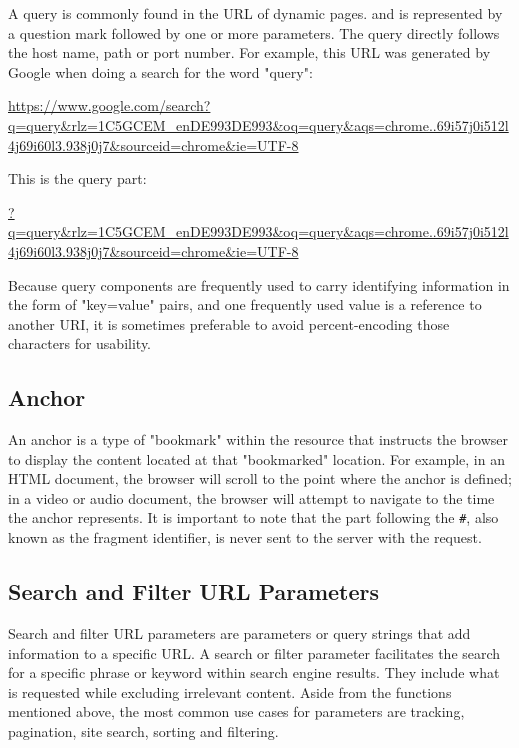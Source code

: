 A query is commonly found in the URL of dynamic pages. and is represented by a question mark followed by one or more parameters. The query directly follows the host name, path or port number. For example, this URL was generated by Google when doing a search for the word "query":

\begin{center}
  \url{https://www.google.com/search?q=query&rlz=1C5GCEM_enDE993DE993&oq=query&aqs=chrome..69i57j0i512l4j69i60l3.938j0j7&sourceid=chrome&ie=UTF-8}
\end{center}

\noindent This is the query part:

\begin{center}
  \url{?q=query&rlz=1C5GCEM_enDE993DE993&oq=query&aqs=chrome..69i57j0i512l4j69i60l3.938j0j7&sourceid=chrome&ie=UTF-8}
\end{center}

Because query components are frequently used to carry identifying information in the form of "key=value" pairs, and one frequently used value is a reference to another URI, it is sometimes preferable to avoid percent-encoding those characters for usability.

\subsection*{Anchor}
An anchor is a type of "bookmark" within the resource that instructs the browser to display the content located at that "bookmarked" location. For example, in an HTML document, the browser will scroll to the point where the anchor is defined; in a video or audio document, the browser will attempt to navigate to the time the anchor represents. It is important to note that the part following the \texttt{\#}, also known as the fragment identifier, is never sent to the server with the request.

\subsection{Search and Filter URL Parameters}
Search and filter URL parameters are parameters or query strings that add information to a specific URL. A search or filter parameter facilitates the search for a specific phrase or keyword within search engine results. They include what is requested while excluding irrelevant content. Aside from the functions mentioned above, the most common use cases for parameters are tracking, pagination, site search, sorting and filtering.


